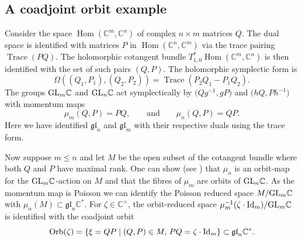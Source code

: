 \documentclass[pdftex]{sigma}
\numberwithin{equation}{section}
\DeclareMathOperator{\Hom}{Hom}
\DeclareMathOperator{\Tr}{Trace}
\newcommand{\C}{\mathbb{C}}
\newcommand{\Id}{{\rm Id}}
\begin{document}
\subsection{A coadjoint orbit example}\label{theexample}
Consider the space $\Hom(\C^m,\C^n)$ of complex $n\times m$ matrices $Q$. The dual space is identified with matrices $P$ in $\Hom(\C^n,\C^m)$ via the trace pairing $\Tr(PQ)$. The holomorphic cotangent bundle $T^*_{1,0}\Hom(\C^m,\C^n)$ is then identified with the set of such pairs $(Q,P)$. The holomorphic symplectic form is
\begin{equation*}%
	\Omega((Q_1,P_1),(Q_2,P_2))=\Tr(P_2Q_1-P_1Q_2).
\end{equation*}
The groups ${\rm GL}_m\C$ and ${\rm GL}_n\C$ act symplectically by $\bigl(Qg^{-1},gP\bigr)$ and $\bigl(hQ,Ph^{-1}\bigr)$ with momentum maps
\begin{equation*}	%
	\mu_m(Q,P)=PQ,\qquad\text{and}\qquad\mu_n(Q,P)=QP.
\end{equation*}
Here we have identified $\mathfrak{gl}_n$ and $\mathfrak{gl}_m$ with their respective duals using the trace form.

Now suppose $m\le n$ and let $M$ be the open subset of the cotangent bundle where both $Q$ and $P$ have maximal rank. One can show (see \cite{dualpairs}) that $\mu_n$ is an orbit-map for the ${\rm GL}_m\C$-action on $M$ and that the fibres of $\mu_m$ are orbits of ${\rm GL}_n\C$. As the momentum map is Poisson we can identify the Poisson reduced space $M/{\rm GL}_m\C$ with $\mu_n(M)\subset\mathfrak{gl}_n\C^*$. For $\zeta\in\C^\times$, the orbit-reduced space $\mu_m^{-1}(\zeta\cdot\Id_m)/{\rm GL}_m\C$ is identified with the coadjoint orbit
\begin{equation}
	\label{coad_orbit}
	{\rm Orb}(\zeta)=\{\xi=QP\mid (Q,P)\in M,\,PQ=\zeta\cdot\Id_m\}\subset\mathfrak{gl}_n\C^*.
\end{equation}
\end{document}
